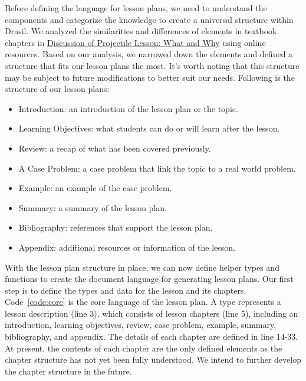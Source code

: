 Before defining the language for lesson plans, we need to understand the 
components and categorize the knowledge to create a universal structure within 
Drasil. We analyzed the similarities and differences of elements in textbook 
chapters in 
\href{https://github.com/smiths/caseStudies/blob/master/CaseStudies/projectile/projectileLesson/AboutProjectileLesson.pdf}{Discussion
 of Projectile Lesson: What and	Why} using online resources. Based on our 
analysis, we narrowed down the elements and defined a structure that fits our 
lesson plans the most. It's worth noting that this structure may be subject to 
future modifications to better suit our needs. Following is the structure of
our lesson plans:
\begin{itemize}
	\item Introduction: an introduction of the lesson plan or the topic.
	\item Learning Objectives: what students can do or will learn after the 
	lesson.  
	\item Review: a recap of what has been covered previously.
	\item A Case Problem: a case problem that link the topic to a real world 
	problem.
	\item Example: an example of the case problem.
	\item Summary: a summary of the lesson plan.
	\item Bibliography: references that support the lesson plan.
	\item Appendix: additional resources or information of the lesson.
\end{itemize}

With the lesson plan structure in place, we can now define helper types and 
functions to create the document language for generating lesson plans. Our 
first step is to define the types and data for the lesson and its chapters. 
Code~\ref{code:core} is the core language of the lesson plan. A 
 type represents a lesson description (line 3), which consists 
of lesson chapters (line 5), including an introduction, learning objectives, 
review, case problem, example, summary, bibliography, and appendix. The details 
of each chapter are defined in line 14-33. At present,  the contents of each 
chapter are the only defined elements as the chapter structure has not yet been 
fully understood. We intend to further develop the chapter structure in the 
future.  

